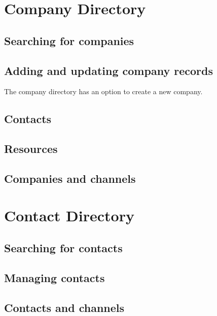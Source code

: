 \documentclass[12 pt]{book}
\begin{document}
%
%
%

\chapter{Company Directory}

\section{Searching for companies}

\section{Adding and updating company records}

The company directory has an option to create a new company.


\section{Contacts}

\section{Resources}

\section{Companies and channels}

%
%
%

\chapter{Contact Directory}

\section{Searching for contacts}

\section{Managing contacts}

\section{Contacts and channels}
\end{document}
